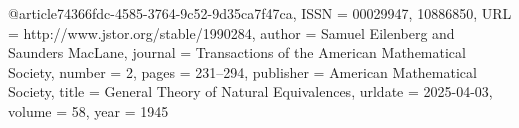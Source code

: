 @article{74366fdc-4585-3764-9c52-9d35ca7f47ca,
 ISSN = {00029947, 10886850},
 URL = {http://www.jstor.org/stable/1990284},
 author = {Samuel Eilenberg and Saunders MacLane},
 journal = {Transactions of the American Mathematical Society},
 number = {2},
 pages = {231--294},
 publisher = {American Mathematical Society},
 title = {General Theory of Natural Equivalences},
 urldate = {2025-04-03},
 volume = {58},
 year = {1945}
}
